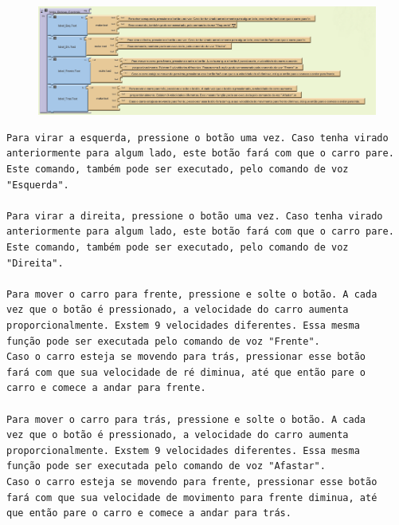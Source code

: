 \documentclass[portugues, brazil, a4paper,12pt]{article}
\begin{document}
\begin{figure}[H]
	\centering
	\includegraphics[scale=.7]{img/ajuda/controle.png}
	
\end{figure}
\begin{verbatim}
Para virar a esquerda, pressione o botão uma vez. Caso tenha virado 
anteriormente para algum lado, este botão fará com que o carro pare.
Este comando, também pode ser executado, pelo comando de voz "Esquerda".

Para virar a direita, pressione o botão uma vez. Caso tenha virado 
anteriormente para algum lado, este botão fará com que o carro pare.
Este comando, também pode ser executado, pelo comando de voz "Direita".

Para mover o carro para frente, pressione e solte o botão. A cada 
vez que o botão é pressionado, a velocidade do carro aumenta 
proporcionalmente. Exstem 9 velocidades diferentes. Essa mesma 
função pode ser executada pelo comando de voz "Frente".
Caso o carro esteja se movendo para trás, pressionar esse botão 
fará com que sua velocidade de ré diminua, até que então pare o 
carro e comece a andar para frente.

Para mover o carro para trás, pressione e solte o botão. A cada 
vez que o botão é pressionado, a velocidade do carro aumenta 
proporcionalmente. Exstem 9 velocidades diferentes. Essa mesma 
função pode ser executada pelo comando de voz "Afastar".
Caso o carro esteja se movendo para frente, pressionar esse botão 
fará com que sua velocidade de movimento para frente diminua, até 
que então pare o carro e comece a andar para trás.

\end{verbatim}
\end{document}
